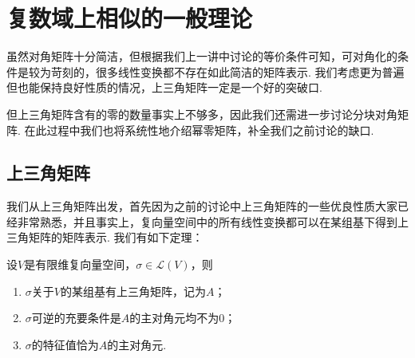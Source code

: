 \chapter{复数域上相似的一般理论}

虽然对角矩阵十分简洁，但根据我们上一讲中讨论的等价条件可知，可对角化的条件是较为苛刻的，很多线性变换都不存在如此简洁的矩阵表示. 我们考虑更为普遍但也能保持良好性质的情况，上三角矩阵一定是一个好的突破口.

但上三角矩阵含有的零的数量事实上不够多，因此我们还需进一步讨论分块对角矩阵. 在此过程中我们也将系统性地介绍幂零矩阵，补全我们之前讨论的缺口.

\section{上三角矩阵}

我们从上三角矩阵出发，首先因为之前的讨论中上三角矩阵的一些优良性质大家已经非常熟悉，并且事实上，复向量空间中的所有线性变换都可以在某组基下得到上三角矩阵的矩阵表示. 我们有如下定理：
\begin{theorem}\label{thm:17:上三角矩阵存在}
    设$V$是有限维复向量空间，$\sigma\in \mathcal{L}(V)$，则
    \begin{enumerate}
        \item $\sigma$关于$V$的某组基有上三角矩阵，记为$A$；

        \item $\sigma$可逆的充要条件是$A$的主对角元均不为0；

        \item $\sigma$的特征值恰为$A$的主对角元.
    \end{enumerate}
\end{theorem}

